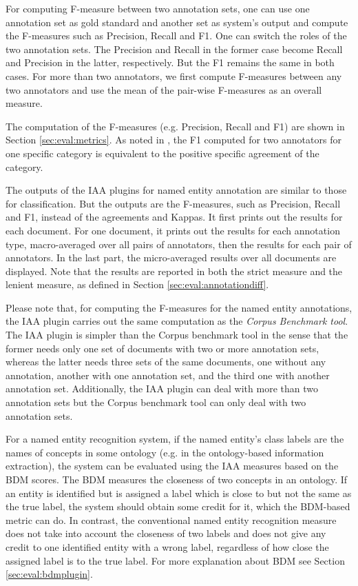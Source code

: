 For computing F-measure between two annotation sets, one can use one annotation
set as gold standard and another set as system's output and compute the
F-measures such as Precision, Recall and F1. One can switch the roles of the two
annotation sets. The Precision and Recall in the former case become Recall and
Precision in the latter, respectively.  But the F1 remains the same in both
cases.  For more than two annotators, we first compute F-measures between any two
annotators and use the mean of the pair-wise F-measures as an overall measure.

The computation of the F-measures (e.g. Precision, Recall and F1) are
 shown in Section \ref{sec:eval:metrics}. As noted in \cite{Hripcsak05}, the F1
 computed for two annotators for one specific category is equivalent to the
 positive specific agreement of the category.

The outputs of the IAA plugins for named entity annotation are similar to those
for classification. But the outputs are the F-measures, such as Precision, Recall
and F1, instead of the agreements and Kappas. It first prints out the results for
each document. For one document, it prints out the results for each annotation
type, macro-averaged over all pairs of annotators, then the results for each pair
of annotators.  In the last part, the micro-averaged results over all documents
are displayed.  Note that the results are reported in both the strict measure and
the lenient measure, as defined in Section \ref{sec:eval:annotationdiff}.

Please note that, for computing the F-measures for the named entity annotations,
the IAA plugin carries out the same computation as the {\em Corpus Benchmark
tool}.  The IAA plugin is simpler than the Corpus benchmark tool in the sense
that the former needs only one set of documents with two or more annotation sets,
whereas the latter needs three sets of the same documents, one without any
annotation, another with one annotation set, and the third one with another
annotation set. Additionally, the IAA plugin can deal with more than two
annotation sets but the Corpus benchmark tool can only deal with two annotation
sets.


For a named entity recognition system, if the named entity's class
labels are the names of concepts in some ontology (e.g. in the
ontology-based information extraction), the system can be evaluated
using the IAA measures based on the BDM scores. The BDM measures the
closeness of two concepts in an ontology. If an entity is identified
but is assigned a label which is close to but not the same as the true
label, the system should obtain some credit for it, which the
BDM-based metric can do. In contrast, the conventional named entity
recognition measure does not take into account the closeness of two
labels and does not give any credit to one identified entity with a
wrong label, regardless of how close the assigned label is to the true
label. For more explanation about BDM see
Section \ref{sec:eval:bdmplugin}.

